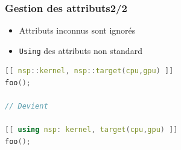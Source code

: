 \documentclass[C++.tex]{subfiles}
\begin{document}
\begin{frame}[fragile]
	\frametitle{Gestion des attributs\titlehfill{}2/2}
	\begin{itemize}
		\item Attributs inconnus sont ignorés
	

		\item \lstinline|Using| des attributs non standard
	\end{itemize}

	\begin{lstlisting}[language=C++]
[[ nsp::kernel, nsp::target(cpu,gpu) ]]
foo();

// Devient

[[ using nsp: kernel, target(cpu,gpu) ]]
foo();\end{lstlisting}
\end{frame}
\end{document}
